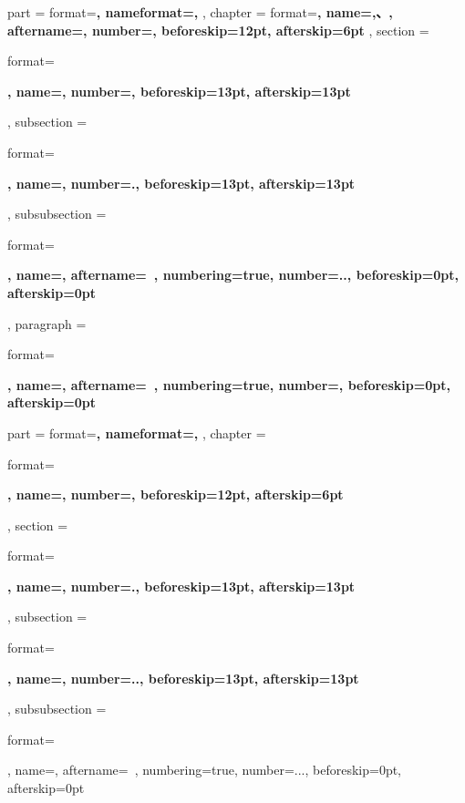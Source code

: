 {
    \ctexset
    {
        part =
        {
            format=\centering{}\bfseries,
            nameformat=\centering\heiti\fontsize{48}{48}\bfseries,
        },
        chapter =
        {
            format=\centering{}\bfseries,
            name={,、},
            aftername=,
            number=,
            beforeskip=12pt,
            afterskip=6pt
        },
        section =
        {
            format=\raggedright{}\bfseries,
            name={},
            number=,
            beforeskip=13pt,
            afterskip=13pt
        },
        subsection =
        {
            format=\raggedright{}\bfseries,
            name={},
            number=.,
            beforeskip=13pt,
            afterskip=13pt
        },
        subsubsection =
        {
            format=\raggedright{}\bfseries,
            name={},
            aftername=~,
            numbering=true,
            number=..,
            beforeskip=0pt,
            afterskip=0pt
        },
        paragraph =
        {
            format=\raggedright{}\bfseries,
            name={},
            aftername=~,
            numbering=true,
            number=,
            beforeskip=0pt,
            afterskip=0pt
        }
    }
}
{
    \ctexset
    {
        part =
        {
            format=\centering{}\bfseries,
            nameformat=\centering\heiti\fontsize{48}{48}\bfseries,
        },
        chapter =
        {
            format=\raggedright{}\bfseries,
            name={},
            number=,
            beforeskip=12pt,
            afterskip=6pt
        },
        section =
        {
            format=\raggedright{}\bfseries,
            name={},
            number=.,
            beforeskip=13pt,
            afterskip=13pt
        },
        subsection =
        {
            format=\raggedright{}\bfseries,
            name={},
            number=..,
            beforeskip=13pt,
            afterskip=13pt
        },
        subsubsection =
        {
            format=\raggedright{},
            name={},
            aftername=~,
            numbering=true,
            number=...,
            beforeskip=0pt,
            afterskip=0pt
        }
    }
}

